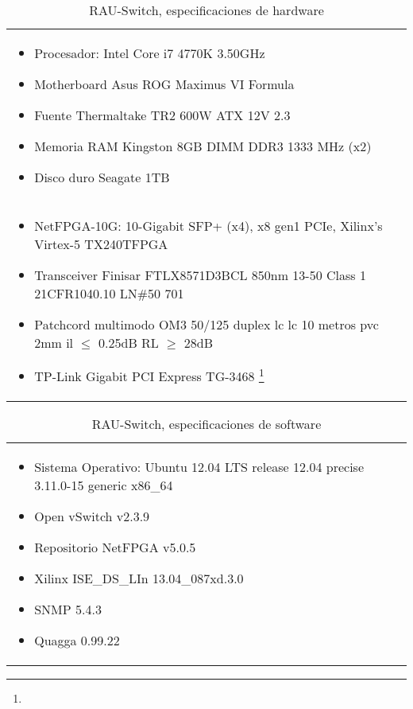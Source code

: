 \begin{table}[!h]\centering
\begin{tabularx}{\textwidth}{|>{\setlength\hsize{1.0\hsize}\setlength\linewidth{\hsize}}X|}
\hline
\multicolumn{1}{|c|}{Hardware}\\
\hline
\begin{itemize}
\item Procesador: Intel Core i7 4770K 3.50GHz
\item Motherboard Asus ROG Maximus VI Formula
\item Fuente Thermaltake TR2 600W ATX 12V 2.3
\item Memoria RAM Kingston 8GB DIMM DDR3 1333 MHz (x2)
\item Disco duro Seagate 1TB
\end{itemize}\\

\begin{itemize}
\item NetFPGA-10G: 10-Gigabit SFP+ (x4), x8 gen1 PCIe, Xilinx’s Virtex-5 TX240TFPGA
\item Transceiver Finisar FTLX8571D3BCL 850nm 13-50
	  Class 1 21CFR1040.10 LN\#50 7\/01
\item Patchcord multimodo OM3 50/125 duplex lc lc 10 metros pvc 2mm
	  il $\leq$ 0.25dB RL $\geq$ 28dB
\item TP-Link Gigabit PCI Express TG-3468 \footnote{}

\end{itemize}\\
\hline
\end{tabularx}
\caption{RAU-Switch, especificaciones de hardware}
\label{table:RAUHSpecs}
\end{table}


\begin{table}[!h]\centering
\begin{tabularx}{\textwidth}{|>{\setlength\hsize{1.0\hsize}\setlength\linewidth{\hsize}}X|}
\hline
\multicolumn{1}{|c|}{Software}\\
\hline
\begin{itemize}
\item Sistema Operativo: Ubuntu 12.04 LTS release 12.04 precise 3.11.0-15 generic x86\_64
\item Open vSwitch v2.3.9
\item Repositorio NetFPGA v5.0.5
\item Xilinx ISE\_DS\_LIn 13.04\_087xd.3.0
\item SNMP 5.4.3
\item Quagga 0.99.22
\end{itemize}\\
\hline
\end{tabularx}
\caption{RAU-Switch, especificaciones de software}
\label{table:RAUSSpecs}
\end{table}

